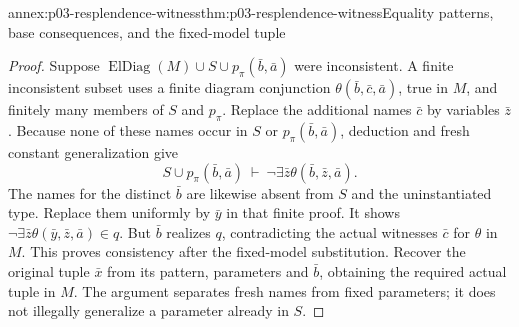 \begin{annexitem}{annex:p03-resplendence-witness}{thm:p03-resplendence-witness}{Equality patterns, base consequences, and the fixed-model tuple}
\begin{proof}
Suppose \(\operatorname{ElDiag}(M)\cup S\cup p_\pi(\bar b,\bar a)\)
were inconsistent. A finite inconsistent subset uses a finite diagram
conjunction \(\theta(\bar b,\bar c,\bar a)\), true in \(M\), and
finitely many members of \(S\) and \(p_\pi\). Replace the additional
names \(\bar c\) by variables \(\bar z\). Because none of these
names occur in \(S\) or \(p_\pi(\bar b,\bar a)\), deduction and fresh
constant generalization give
\[
 S\cup p_\pi(\bar b,\bar a)\ \vdash\
             \neg\exists\bar z\theta(\bar b,\bar z,\bar a).
\]
The names for the distinct \(\bar b\) are likewise absent from \(S\)
and the uninstantiated type. Replace them uniformly by \(\bar y\) in
that finite proof. It shows
\(\neg\exists\bar z\theta(\bar y,\bar z,\bar a)\in q\).
But \(\bar b\) realizes \(q\), contradicting the actual witnesses
\(\bar c\) for \(\theta\) in \(M\). This proves consistency after
the fixed-model substitution. Recover the original tuple \(\bar x\)
from its pattern, parameters and \(\bar b\), obtaining the required
actual tuple in \(M\). The argument separates fresh names from fixed
parameters; it does not illegally generalize a parameter already in \(S\).
\end{proof}
\end{annexitem}


